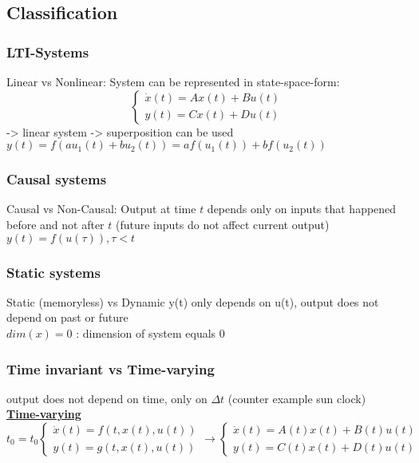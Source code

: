 \subsection*{Classification}
    \subsubsection*{LTI-Systems}
        Linear vs Nonlinear:
        System can be represented in state-space-form:
        \begin{equation}\label{eqn:LTI}
            \begin{cases}
                \dot{x}(t) = Ax(t) + Bu(t)\\
                y(t) = Cx(t) + Du(t)
            \end{cases}
        \end{equation}
        -> linear system -> superposition can be used\\
        $y(t) = f(au_1(t)+bu_2(t)) = af(u_1(t)) + bf(u_2(t))$
    
    \subsubsection*{Causal systems}
        Causal vs Non-Causal:
        Output at time $t$ depends only on inputs that happened before and not after $t$ (future inputs do not affect current output)\\
        $y(t) = f(u(\tau)), \tau < t$
    
    \subsubsection*{Static systems}
        Static (memoryless) vs Dynamic
        y(t) only depends on u(t), output does not depend on past or future\\
        $dim(x) = 0$ : dimension of system equals 0

    \subsubsection*{Time invariant vs Time-varying}
        output does not depend on time, only on $\Delta t$ (counter example sun clock)\\
        {\centering\textbf{\underline{Time-varying}}}
        \begin{equation}
            t_0 = t_0
            \begin{cases}
                \dot{x}(t) = f(t, x(t), u(t))\\
                y(t) = g(t, x(t), u(t))
            \end{cases}
            \rightarrow
            \begin{cases}
                \dot{x}(t) = A(t)x(t) + B(t)u(t)\\
                y(t) = C(t)x(t) + D(t)u(t)
            \end{cases}
        \end{equation}

